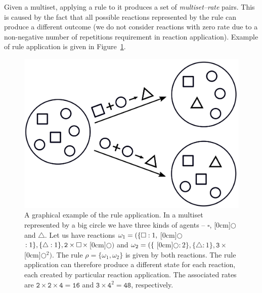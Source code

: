 \documentclass[11pt,a4paper]{report}
\begin{document}
Given a multiset, applying a rule to it produces a set of \emph{multiset--rate} pairs. This is caused by the fact that all possible reactions represented by the rule can produce a different outcome (we do not consider reactions with zero rate due to a non-negative number of repetitions requirement in reaction application). Example of rule application is given in Figure~\ref{rule_example}.

\begin{figure}[!h]
	\begin{center}
		\includegraphics[scale=0.2]{images/rule.png}
	\end{center}
	\caption{A graphical example of the rule application. In a multiset represented by a big circle we have three kinds of agents -- {\large $\square$}, \raisebox{0.04cm}[0cm]{{$\bigcirc$}} and $\bigtriangleup$. Let us have reactions $\omega_1 = (\{{\large \square}:1,\hspace{0.1cm} $\raisebox{0.04cm}[0cm]{{$\bigcirc$}}\hspace{0.1cm}$:1\}, \{\bigtriangleup:1\}, \mathtt{2}\times{\large \square}\hspace{0.05cm}\times$\hspace{0.05cm}\raisebox{0.04cm}[0cm]{{$\bigcirc$}}$)$ and $\omega_2 = (\{\hspace{0.1cm} $\raisebox{0.04cm}[0cm]{{$\bigcirc$}}\hspace{0.1cm}$:2\}, \{\bigtriangleup:1\}, \mathtt{3}\times$\hspace{0.05cm}\raisebox{0.04cm}[0cm]{{$\bigcirc$}}$^2)$. The rule $\rho = \{ \omega_1, \omega_2 \}$ is given by both reactions. The rule application can therefore produce a different state for each reaction, each created by particular reaction application. The associated rates are $\mathtt{2} \times \mathtt{2} \times \mathtt{4} = \mathtt{16}$ and $\mathtt{3} \times \mathtt{4}^2 = \mathtt{48}$, respectively.}\label{rule_example}
\end{figure}
\end{document}
